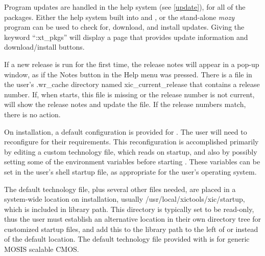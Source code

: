 Program updates are handled in the help system (see \ref{update}), for
all of the {\XicTools} packages.  Either the help system built into
{\Xic} and {\WRspice}, or the stand-alone {\it mozy} program can be
used to check for, download, and install updates.  Giving the keyword
``{\vt :xt\_pkgs}'' will display a page that provides update
information and download/install buttons.

If a new {\Xic} release is run for the first time, the release notes
will appear in a pop-up window, as if the {\cb Notes} button in the
{\cb Help} menu was pressed.  There is a file in the user's {\vt
.wr\_cache} directory named {\vt xic\_current\_release} that contains a
release number.  If, when {\Xic} starts, this file is missing or the
release number is not current, {\Xic} will show the release notes and
update the file.  If the release numbers match, there is no action.

On installation, a default configuration is provided for {\Xic}.  The
user will need to reconfigure {\Xic} for their requirements.  This
reconfiguration is accomplished primarily by editing a custom
technology file, which {\Xic} reads on startup, and also by possibly
setting some of the environment variables before starting {\Xic}. 
These variables can be set in the user's shell startup file, as
appropriate for the user's operating system. 

The default technology file, plus several other files needed, are
placed in a system-wide location on installation, usually {\vt
/usr/local/xictools/xic/startup}, which is included in library
path.  This directory is typically set to be read-only, thus the user
must establish an alternative location in their own directory tree for
customized startup files, and add this to the library path to the left
of or instead of the default location.  The default technology file
provided with {\Xic} is for generic MOSIS scalable CMOS.

